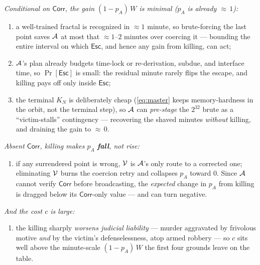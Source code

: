 \smallskip
\noindent\emph{Conditional on $\mathsf{Corr}$, the gain $(1 - p_A)\,W$ is minimal
($p_A$ is already ${\approx}\,1$):}
\begin{enumerate}[nosep,leftmargin=1.6em]
  \item a well-trained fractal is recognized in ${\approx}1$ minute, so
        brute-forcing the last point saves $\mathcal{A}$ at most that
        ${\approx}1$--$2$ minutes over coercing it --- bounding the entire
        interval on which $\mathsf{Esc}$, and hence any gain from killing, can
        act;
  \item $\mathcal{A}$'s plan already budgets time-lock or re-derivation, subdue, and
        interface time, so $\Pr[\mathsf{Esc}]$ is small: the residual minute
        rarely flips the escape, and killing pays off only inside $\mathsf{Esc}$;
  \item the terminal $K_N$ is deliberately cheap (\eqref{eq:master} keeps
        memory-hardness in the orbit, not the terminal step), so $\mathcal{A}$ can
        \emph{pre-stage} the $2^{32}$ brute as a ``victim-stalls'' contingency ---
        recovering the shaved minutes \emph{without} killing, and draining the
        gain to ${\approx}\,0$.
\end{enumerate}

\noindent\emph{Absent $\mathsf{Corr}$, killing makes $p_A$ \textbf{fall}, not
rise:}
\begin{enumerate}[nosep,leftmargin=1.6em,start=4]
  \item if any surrendered point is wrong, $\mathcal{V}$ is $\mathcal{A}$'s only route
        to a corrected one; eliminating $\mathcal{V}$ burns the coercion retry and
        collapses $p_A$ toward $0$. Since $\mathcal{A}$ cannot verify
        $\mathsf{Corr}$ before broadcasting, the \emph{expected} change in $p_A$
        from killing is dragged below its $\mathsf{Corr}$-only value --- and can
        turn negative.
\end{enumerate}

\noindent\emph{And the cost $c$ is large:}
\begin{enumerate}[nosep,leftmargin=1.6em,start=5]
  \item the killing sharply \emph{worsens judicial liability} --- murder
        aggravated by frivolous motive \emph{and} by the victim's defenselessness,
        atop armed robbery --- so $c$ sits well above the minute-scale
        $(1 - p_A)\,W$ the first four grounds leave on the table.
\end{enumerate}

